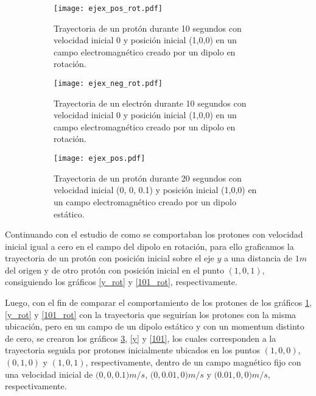 \documentclass{article}
\begin{document}
\begin{figure}[]
    \centering
    \begin{subfigure}[b]{0.32\textwidth}
        \centering
        \texttt{[image: ejex\_pos\_rot.pdf]}
        \caption{Trayectoria de un protón durante 10 segundos con velocidad inicial 0 y posición inicial (1,0,0) en un campo electromagnético creado por un dipolo en rotación. }
        \label{x_pos_tor}
    \end{subfigure}
    \hfill
    \begin{subfigure}[b]{0.32\textwidth}
        \centering
        \texttt{[image: ejex\_neg\_rot.pdf]}
        \caption{Trayectoria de un electrón durante 10 segundos con velocidad inicial 0 y posición inicial (1,0,0) en un campo electromagnético creado por un dipolo en rotación.}
        \label{x_neg_rot}
    \end{subfigure}
    \hfill
    \begin{subfigure}[b]{0.32\textwidth}
        \centering
        \texttt{[image: ejex\_pos.pdf]}
        \caption{Trayectoria de un protón durante 20 segundos con velocidad inicial (0, 0, 0.1) y posición inicial (1,0,0) en un campo electromagnético creado por un dipolo estático.}
        \label{x_pos}
    \end{subfigure}
    \caption{}
    \label{}
\end{figure}


\vspace{2mm}
Continuando con el estudio de como se comportaban los protones con velocidad inicial igual a cero en el campo del dipolo en rotación, para ello graficamos la trayectoria de un protón con posición inicial sobre el eje $y$ a una distancia de $1m$ del origen y de otro protón con posición inicial en el punto $(1,0,1)$, consiguiendo los gráficos \ref{y_rot} y \ref{101_rot}, respectivamente.

\vspace{2mm}
Luego, con el fin de comparar el comportamiento de los protones de los gráficos \ref{x_pos_tor}, \ref{y_rot} y \ref{101_rot} con la trayectoria que seguirían los protones con la misma ubicación, pero en un campo de un dipolo estático y con un momentum distinto de cero, se crearon los gráficos \ref{x_pos}, \ref{y} y \ref{101}, los cuales corresponden a la trayectoria seguida por protones inicialmente ubicados en los puntos $(1,0,0)$, $(0,1,0)$ y $(1,0,1)$, respectivamente, dentro de un campo magnético fijo con una velocidad inicial de $(0,0,0$.$1) m/s$, $(0, 0$.$01, 0)m/s$ y $( 0$.$01, 0, 0)m/s$, respectivamente.
\end{document}
